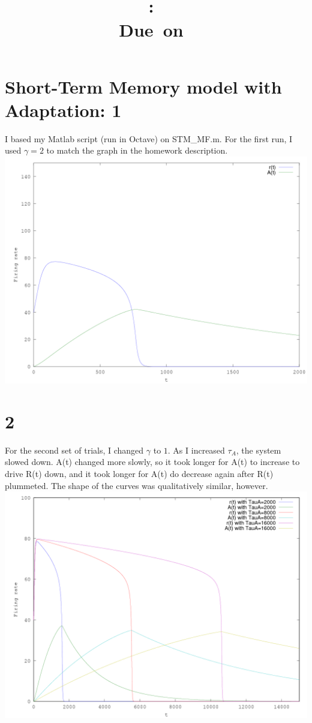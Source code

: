 \documentclass[11pt]{article}
\title{\large{\hmwkAuthorName}\vspace{0.1in}\\\textmd{\textbf{\hmwkClass:\ \hmwkTitle}}\\\normalsize\vspace{0.1in}\small{Due\ on\ \hmwkDueDate}\\\vspace{0.1in}\large{\textit{\hmwkClassInstructor}}\vspace{0.1in}}
\author{}
\date{}
\begin{document}
\maketitle

\section*{Short-Term Memory model with Adaptation: 1}
I based my Matlab script (run in Octave) on STM\_MF.m.  For the first run, I used $\gamma=2$ to match the graph in the homework description.\\
\includegraphics[width=6in]{1.png}\\
\section*{2}
For the second set of trials, I changed $\gamma$ to $1$.  As I increased $\tau_A$, the system slowed down.  A(t) changed more slowly, so it took longer for A(t) to increase to drive R(t) down, and it took longer for A(t) do decrease again after R(t) plummeted.  The shape of the curves was qualitatively similar, however.\\
\includegraphics[width=6in]{2.png}\\
\end{document}

